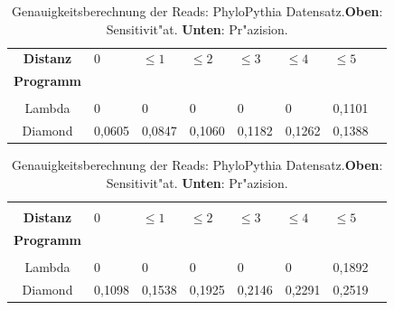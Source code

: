 \documentclass[10pt, a4paper]{article}[08.12.2015]
\begin{document}
      \begin{table}[H]
        \begin{tabular}{clllllll}
          \textbf{Distanz}&0&$\leq1$&$\leq2$&$\leq3$&$\leq4$&$\leq5$\\
          \textbf{Programm}&&&&&\\ \hline
          &&&&&&\\ 
          Lambda&0&0&0&0&0&0,1101\\
          Diamond&0,0605&0,0847&0,1060&0,1182&0,1262&0,1388\\
        \end{tabular}

         \begin{tabular}{clllllll}
         &&&&&&\\
          \textbf{Distanz}&0&$\leq1$&$\leq2$&$\leq3$&$\leq4$&$\leq5$\\
          \textbf{Programm}&&&&&\\ \hline 
          &&&&&&\\
          Lambda&0&0&0&0&0&0,1892\\
          Diamond&0,1098&0,1538&0,1925&0,2146&0,2291&0,2519\\
        \end{tabular}
        \caption[Genauigkeitsberechnung der Reads: PhyloPythia Datensatz.]{\small{Genauigkeitsberechnung der Reads: PhyloPythia Datensatz.\newline \textbf{Oben}: Sensitivit"at. \textbf{Unten}: Pr"azision.} }
      \end{table}
     
\end{document}
